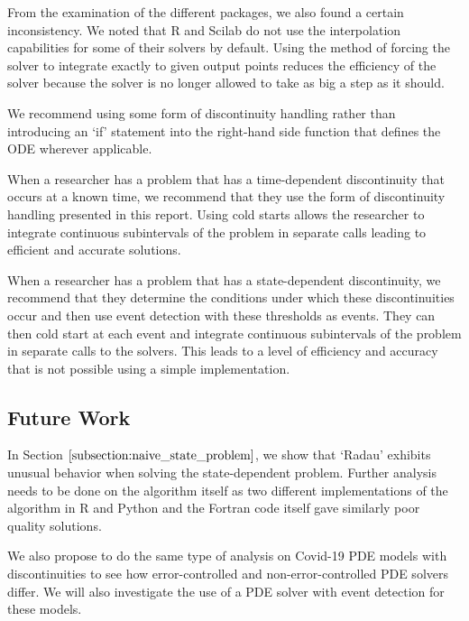 From the examination of the different packages, we also found a certain inconsistency. We noted that R and Scilab do not use the interpolation capabilities for some of their solvers by default. Using the method of forcing the solver to integrate exactly to given output points reduces the efficiency of the solver because the solver is no longer allowed to take as big a step as it should.

We recommend using some form of discontinuity handling rather than introducing an `if' statement into the right-hand side function that defines the ODE wherever applicable.

When a researcher has a problem that has a time-dependent discontinuity that occurs at a known time, we recommend that they use the form of discontinuity handling presented in this report. Using cold starts allows the researcher to integrate continuous subintervals of the problem in separate calls leading to efficient and accurate solutions.

When a researcher has a problem that has a state-dependent discontinuity, we recommend that they determine the conditions under which these discontinuities occur and then use event detection with these thresholds as events. They can then cold start at each event and integrate continuous subintervals of the problem in separate calls to the solvers. This leads to a level of efficiency and accuracy that is not possible using a simple implementation. 

\subsection{Future Work}
\label{subsection:future_work}
In Section $\ref{subsection:naive_state_problem}$, we show that `Radau' exhibits unusual behavior when solving the state-dependent problem. Further analysis needs to be done on the algorithm itself as two different implementations of the algorithm in R and Python and the Fortran code itself gave similarly poor quality solutions.

We also propose to do the same type of analysis on Covid-19 PDE models with discontinuities to see how error-controlled and non-error-controlled PDE solvers differ. We will also investigate the use of a PDE solver with event detection for these models.


